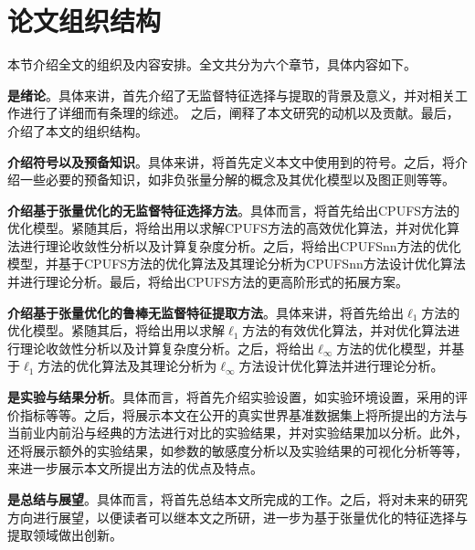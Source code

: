 \section{论文组织结构}
本节介绍全文的组织及内容安排。全文共分为六个章节，具体内容如下。

\textbf{是绪论}。具体来讲，首先介绍了无监督特征选择与提取的背景及意义，并对相关工作进行了详细而有条理的综述。
之后，阐释了本文研究的动机以及贡献。最后，介绍了本文的组织结构。

\textbf{介绍符号以及预备知识}。具体来讲，将首先定义本文中使用到的符号。之后，将介绍一些必要的预备知识，如非负张量分解的概念及其优化模型以及图正则等等。

\textbf{介绍基于张量优化的无监督特征选择方法}。具体而言，将首先给出CPUFS方法的优化模型。紧随其后，将给出用以求解CPUFS方法的高效优化算法，并对优化算法进行理论收敛性分析以及计算复杂度分析。之后，将给出CPUFSnn方法的优化模型，并基于CPUFS方法的优化算法及其理论分析为CPUFSnn方法设计优化算法并进行理论分析。最后，将给出CPUFS方法的更高阶形式的拓展方案。

\textbf{介绍基于张量优化的鲁棒无监督特征提取方法}。具体来讲，将首先给出$\ell_{1}$方法的优化模型。紧随其后，将给出用以求解$\ell_1$方法的有效优化算法，并对优化算法进行理论收敛性分析以及计算复杂度分析。之后，将给出$\ell_{\infty}$方法的优化模型，并基于$\ell_1$方法的优化算法及其理论分析为$\ell_{\infty}$方法设计优化算法并进行理论分析。

\textbf{是实验与结果分析}。具体而言，将首先介绍实验设置，如实验环境设置，采用的评价指标等等。之后，将展示本文在公开的真实世界基准数据集上将所提出的方法与当前业内前沿与经典的方法进行对比的实验结果，并对实验结果加以分析。此外，还将展示额外的实验结果，如参数的敏感度分析以及实验结果的可视化分析等等，来进一步展示本文所提出方法的优点及特点。

\textbf{是总结与展望}。具体而言，将首先总结本文所完成的工作。之后，将对未来的研究方向进行展望，以便读者可以继本文之所研，进一步为基于张量优化的特征选择与提取领域做出创新。


